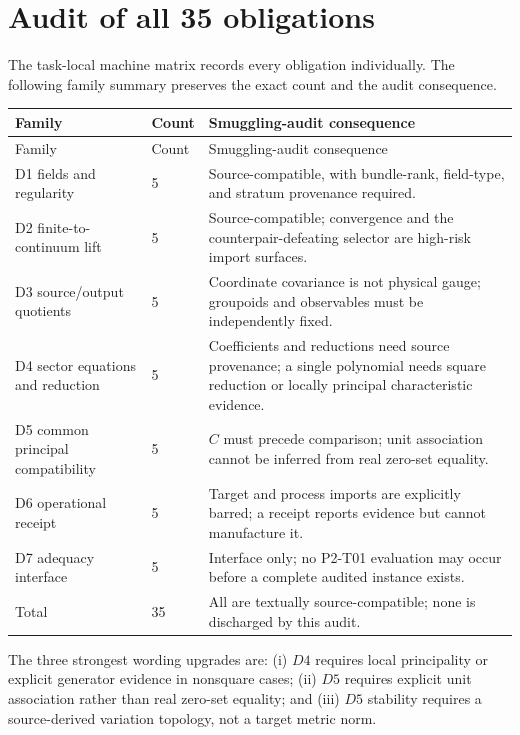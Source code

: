 \documentclass[11pt]{article}
\begin{document}
\section{Audit of all 35 obligations}

The task-local machine matrix records every obligation individually.  The
following family summary preserves the exact count and the audit consequence.

\begin{longtable}{@{}p{}p{}p{}@{}}
\toprule
Family & Count & Smuggling-audit consequence \\
\midrule
\endfirsthead
\toprule
Family & Count & Smuggling-audit consequence \\
\midrule
\endhead
D1 fields and regularity & 5 & Source-compatible, with bundle-rank, field-type, and stratum provenance required. \\
D2 finite-to-continuum lift & 5 & Source-compatible; convergence and the counterpair-defeating selector are high-risk import surfaces. \\
D3 source/output quotients & 5 & Coordinate covariance is not physical gauge; groupoids and observables must be independently fixed. \\
D4 sector equations and reduction & 5 & Coefficients and reductions need source provenance; a single polynomial needs square reduction or locally principal characteristic evidence. \\
D5 common principal compatibility & 5 & $C$ must precede comparison; unit association cannot be inferred from real zero-set equality. \\
D6 operational receipt & 5 & Target and process imports are explicitly barred; a receipt reports evidence but cannot manufacture it. \\
D7 adequacy interface & 5 & Interface only; no P2-T01 evaluation may occur before a complete audited instance exists. \\
\midrule
Total & 35 & All are textually source-compatible; none is discharged by this audit. \\
\bottomrule
\end{longtable}

The three strongest wording upgrades are: (i) $D4$ requires local principality
or explicit generator evidence in nonsquare cases; (ii) $D5$ requires explicit
unit association rather than real zero-set equality; and (iii) $D5$ stability
requires a source-derived variation topology, not a target metric norm.
\end{document}
